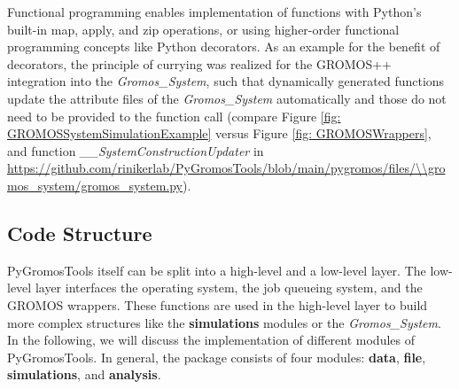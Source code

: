 Functional programming enables implementation of functions with Python's built-in map, apply, and zip operations, or using higher-order functional programming concepts like Python decorators.\cite{Ganney2020} As an example for the benefit of decorators, the principle of currying\cite{Curry1958} was realized for the GROMOS++ integration into the \textit{Gromos\_System}, such that dynamically generated functions update the attribute files of the \textit{Gromos\_System} automatically and those do not need to be provided to the function call (compare Figure \ref{fig: GROMOSSystemSimulationExample} versus Figure \ref{fig: GROMOSWrappers}, and function \textit{\_\_SystemConstructionUpdater} in \url{https://github.com/rinikerlab/PyGromosTools/blob/main/pygromos/files/\\gromos\_system/gromos\_system.py}).

\subsection{Code Structure}
PyGromosTools itself can be split into a high-level and a low-level layer. 
The low-level layer interfaces the operating system, the job queueing system, and the GROMOS wrappers. These functions are used in the high-level layer to build more complex structures like the \textbf{simulations} modules or the \textit{Gromos\_System}. 
%
In the following, we will discuss the implementation of different modules of PyGromosTools. In general, the package consists of four modules: \textbf{data}, \textbf{file}, \textbf{simulations}, and \textbf{analysis}.  


